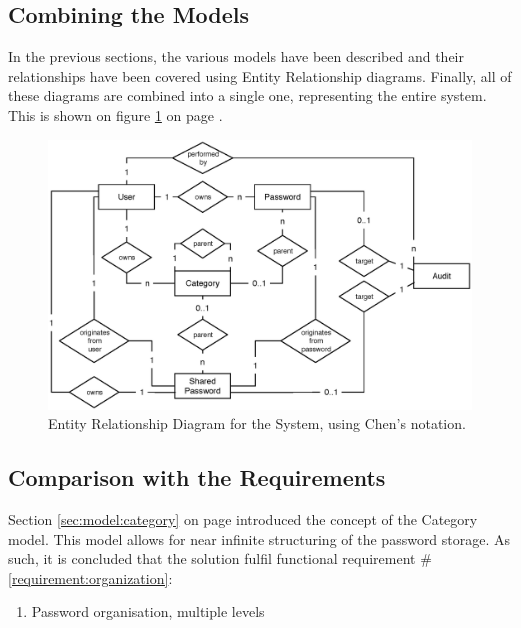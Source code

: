 		\subsection{Combining the Models}
			In the previous sections, the various models have been described and their relationships have been covered using Entity Relationship diagrams. Finally, all of these diagrams are combined into a single one, representing the entire system. This is shown on figure \ref{fig:erd:full} on page \pageref{fig:erd:full}.

			\begin{figure}[p]
				\centering
				\includegraphics[width=\textwidth]{figures/design/uml/erd/complete.eps}
				\caption{Entity Relationship Diagram for the System, using Chen's notation.}
				\label{fig:erd:full}
			\end{figure}

		\subsection{Comparison with the Requirements}
			\label{requirement:fulfilled:organization}
			\label{requirement:fulfilled:new}
			\label{requirement:fulfilled:retrieve}
			\label{requirement:fulfilled:delete}
			\label{requirement:fulfilled:entries}


			Section \ref{sec:model:category} on page \pageref{sec:model:category} introduced the concept of the Category model. This model allows for near infinite structuring of the password storage. As such, it is concluded that the solution fulfil functional requirement \#\ref{requirement:organization}:
			\vspace{-3ex}\begin{enumerate}
				\setlength\itemsep{0.1em}
				\setcounter{enumi}{4-1}
				\item Password organisation, multiple levels
			\end{enumerate}

